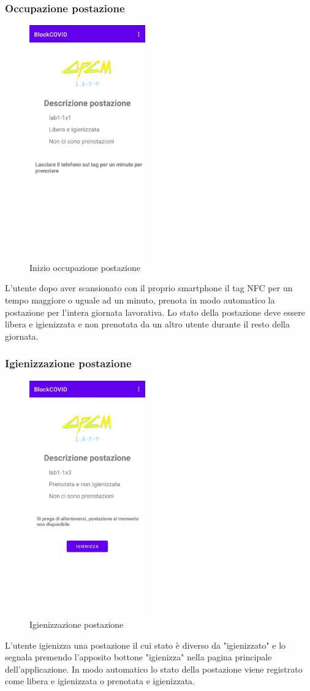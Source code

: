 \subsubsection{Occupazione postazione}
\begin{figure}[H]
	\centering
	\includegraphics[width=5cm]{res/images/DescrizionePostazione1.png}
	\caption{Inizio occupazione postazione}
\end{figure}
L'utente dopo aver scansionato con il proprio smartphone il tag NFC per un tempo maggiore o uguale ad un minuto, prenota in modo automatico la postazione per
l’intera giornata lavorativa. Lo stato della postazione deve essere libera e igienizzata e non prenotata da un altro utente durante il resto della giornata.
\subsubsection{Igienizzazione postazione}
\begin{figure}[H]
	\centering
	\includegraphics[width=5cm]{res/images/DescrizionePostazione3.png}
	\caption{Igienizzazione postazione}
\end{figure}
L'utente igienizza una postazione il cui stato è diverso da "igienizzato" e lo segnala premendo l'apposito bottone "igienizza" nella pagina principale dell'applicazione. In modo automatico lo stato della postazione viene registrato come libera e igienizzata o prenotata e igienizzata.
